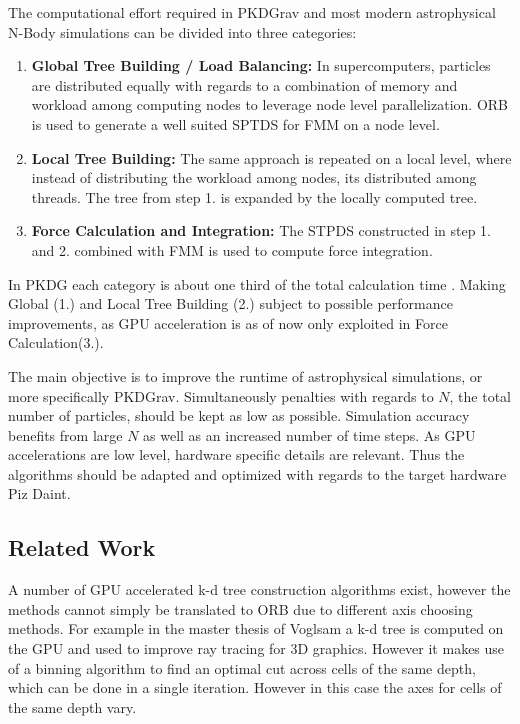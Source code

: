 \documentclass[]{article}
\begin{document}
The computational effort required in PKDGrav and most modern astrophysical N-Body simulations can be divided into three categories:

\begin{enumerate}
	\item \textbf{Global Tree Building / Load Balancing:} In supercomputers, particles are distributed equally with regards to a combination of memory and workload among computing nodes to leverage node level parallelization. ORB is used to generate a well suited SPTDS for FMM on a node level.
	\item \textbf{Local Tree Building:} The same approach is repeated on a local level, where instead of distributing the workload among nodes, its distributed among threads. The tree from step 1. is expanded by the locally computed tree.
	\item \textbf{Force Calculation and Integration:} The STPDS constructed in step 1. and 2. combined with FMM is used to compute force integration. 
\end{enumerate}

In PKDG each category is about one third of the total calculation time \cite{Stadel2001}. Making Global (1.) and Local Tree Building (2.) subject to possible performance improvements, as GPU acceleration is as of now only exploited in Force Calculation(3.).

The main objective is to improve the runtime of astrophysical simulations, or more specifically PKDGrav. Simultaneously penalties with regards to $N$, the total number of particles, should be kept as low as possible. Simulation accuracy benefits from large $N$ as well as an increased number of time steps. As GPU accelerations are low level, hardware specific details are relevant. Thus the algorithms should be adapted and optimized with regards to the target hardware Piz Daint.

\subsection{Related Work}


A number of GPU accelerated k-d tree construction algorithms exist, however the methods cannot simply be translated to ORB due to different axis choosing methods. For example in the master thesis of Voglsam \cite{rrt} a k-d tree is computed on the GPU and used to improve ray tracing for 3D graphics. However it makes use of a binning algorithm to find an optimal cut across cells of the same depth, which can be done in a single iteration. However in this case the axes for cells of the same depth vary.
\end{document}

